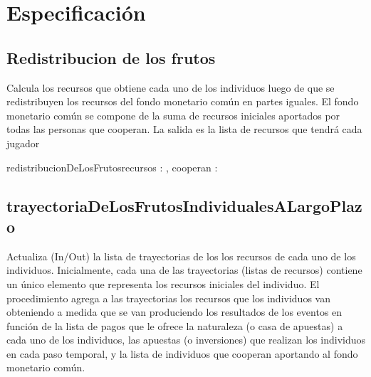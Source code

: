 \documentclass[10pt,a4paper]{article}
\begin{document}
\maketitle

\section{Especificación}
\subsection{Redistribucion de los frutos}

Calcula los recursos que obtiene cada uno de los individuos luego de que se redistribuyen
los recursos del fondo monetario común en partes iguales. El fondo monetario común se compone de la suma de recursos
iniciales aportados por todas las personas que cooperan. La salida es la lista de recursos que tendrá cada jugador


\begin{proc}{redistribucionDeLosFrutos}{\In recursos : \TLista{\float }, \In cooperan : \TLista{\bool}}{\TLista{\float }}

\end{proc}

\subsection{trayectoriaDeLosFrutosIndividualesALargoPlazo}

Actualiza (In/Out) la lista de trayectorias de los los recursos
de cada uno de los individuos. Inicialmente, cada una de las trayectorias (listas de recursos) contiene un único elemento
que representa los recursos iniciales del individuo. El procedimiento agrega a las trayectorias los recursos que los
individuos van obteniendo a medida que se van produciendo los resultados de los eventos en función de la lista de pagos
que le ofrece la naturaleza (o casa de apuestas) a cada uno de los individuos, las apuestas (o inversiones) que realizan
los individuos en cada paso temporal, y la lista de individuos que cooperan aportando al fondo monetario común.
\end{document}
